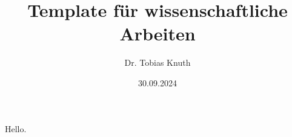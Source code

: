 \documentclass{scrbook}
\title{Template für wissenschaftliche Arbeiten}
\author{Dr. Tobias Knuth}
\date{30.09.2024}
\begin{document}
\maketitle

Hello.
\end{document}
